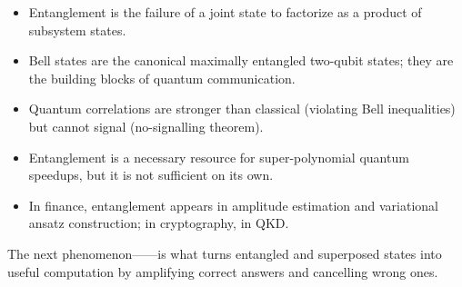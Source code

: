 \begin{itemize}
  \item Entanglement is the failure of a joint state to factorize as a product of subsystem states.
  \item Bell states are the canonical maximally entangled two-qubit states; they are the building blocks of quantum communication.
  \item Quantum correlations are stronger than classical (violating Bell inequalities) but cannot signal (no-signalling theorem).
  \item Entanglement is a necessary resource for super-polynomial quantum speedups, but it is not sufficient on its own.
  \item In finance, entanglement appears in amplitude estimation and variational ansatz construction; in cryptography, in QKD.
\end{itemize}

The next phenomenon------is what turns entangled and superposed states into useful computation by amplifying correct answers and cancelling wrong ones.

\textsep
